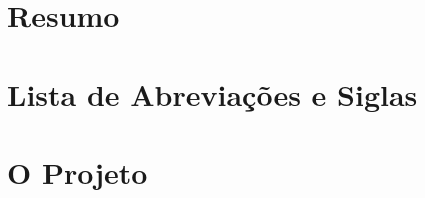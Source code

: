 \documentclass[12pt,a4paper]{report}
\begin{document}



  
  
  
  
  
  
  
  \chapter*{Resumo}
  

  \chapter*{Lista de Abreviações e Siglas}
  


  \listoffigures
  \listoftables
  \tableofcontents

  
  \chapter*{O Projeto}
  
  
\end{document}
